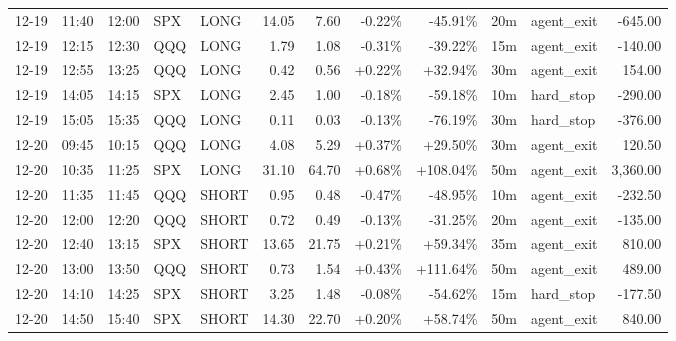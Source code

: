 \documentclass[11pt,a4paper,twoside]{article}
\begin{document}
\begin{center}
\begin{longtable}{>{\color{txtmain}}l l l l l r r r r r >{\color{txtmain}}l r}
12-19 & 11:40 & 12:00 & SPX & LONG & 14.05 & 7.60 & \textcolor{lossred}{-0.22\%} & \textcolor{lossred}{-45.91\%} & 20m & agent\_exit & \textcolor{lossred}{-645.00} \\
12-19 & 12:15 & 12:30 & QQQ & LONG & 1.79 & 1.08 & \textcolor{lossred}{-0.31\%} & \textcolor{lossred}{-39.22\%} & 15m & agent\_exit & \textcolor{lossred}{-140.00} \\
12-19 & 12:55 & 13:25 & QQQ & LONG & 0.42 & 0.56 & \textcolor{wingreen}{+0.22\%} & \textcolor{wingreen}{+32.94\%} & 30m & agent\_exit & \textcolor{wingreen}{154.00} \\
12-19 & 14:05 & 14:15 & SPX & LONG & 2.45 & 1.00 & \textcolor{lossred}{-0.18\%} & \textcolor{lossred}{-59.18\%} & 10m & hard\_stop & \textcolor{lossred}{-290.00} \\
12-19 & 15:05 & 15:35 & QQQ & LONG & 0.11 & 0.03 & \textcolor{lossred}{-0.13\%} & \textcolor{lossred}{-76.19\%} & 30m & hard\_stop & \textcolor{lossred}{-376.00} \\
12-20 & 09:45 & 10:15 & QQQ & LONG & 4.08 & 5.29 & \textcolor{wingreen}{+0.37\%} & \textcolor{wingreen}{+29.50\%} & 30m & agent\_exit & \textcolor{wingreen}{120.50} \\
12-20 & 10:35 & 11:25 & SPX & LONG & 31.10 & 64.70 & \textcolor{wingreen}{+0.68\%} & \textcolor{wingreen}{+108.04\%} & 50m & agent\_exit & \textcolor{wingreen}{3,360.00} \\
12-20 & 11:35 & 11:45 & QQQ & SHORT & 0.95 & 0.48 & \textcolor{lossred}{-0.47\%} & \textcolor{lossred}{-48.95\%} & 10m & agent\_exit & \textcolor{lossred}{-232.50} \\
12-20 & 12:00 & 12:20 & QQQ & SHORT & 0.72 & 0.49 & \textcolor{lossred}{-0.13\%} & \textcolor{lossred}{-31.25\%} & 20m & agent\_exit & \textcolor{lossred}{-135.00} \\
12-20 & 12:40 & 13:15 & SPX & SHORT & 13.65 & 21.75 & \textcolor{wingreen}{+0.21\%} & \textcolor{wingreen}{+59.34\%} & 35m & agent\_exit & \textcolor{wingreen}{810.00} \\
12-20 & 13:00 & 13:50 & QQQ & SHORT & 0.73 & 1.54 & \textcolor{wingreen}{+0.43\%} & \textcolor{wingreen}{+111.64\%} & 50m & agent\_exit & \textcolor{wingreen}{489.00} \\
12-20 & 14:10 & 14:25 & SPX & SHORT & 3.25 & 1.48 & \textcolor{lossred}{-0.08\%} & \textcolor{lossred}{-54.62\%} & 15m & hard\_stop & \textcolor{lossred}{-177.50} \\
12-20 & 14:50 & 15:40 & SPX & SHORT & 14.30 & 22.70 & \textcolor{wingreen}{+0.20\%} & \textcolor{wingreen}{+58.74\%} & 50m & agent\_exit & \textcolor{wingreen}{840.00} \\

\end{longtable}
\end{center}
\end{document}
